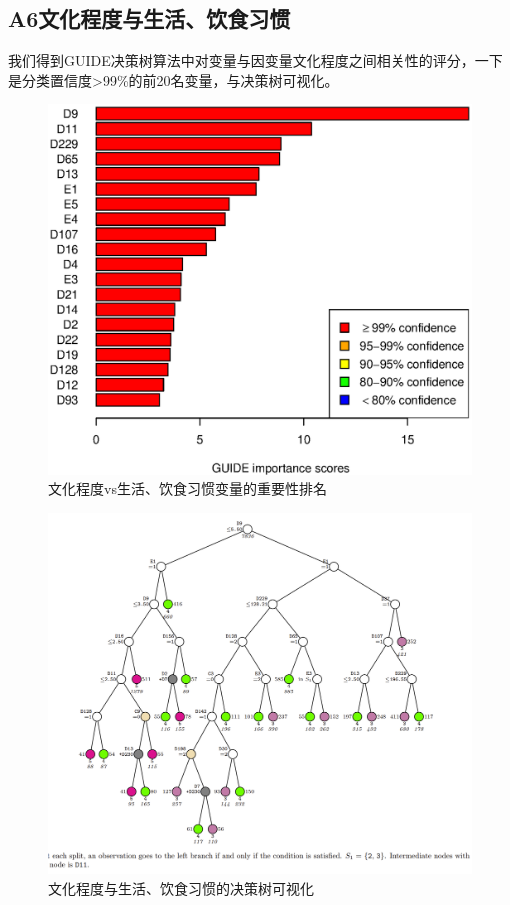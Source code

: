 \documentclass{article}
\begin{document}
\begin{CJK}{UTF8}{gbsn}
\subsection{A6文化程度与生活、饮食习惯}
我们得到GUIDE决策树算法中对变量与因变量文化程度之间相关性的评分，一下是分类置信度>99\%的前20名变量，与决策树可视化。
\begin{figure}[htbp]
    \flushleft
    \includegraphics[scale=0.5]{A6_imp.eps}
    \caption{文化程度vs生活、饮食习惯变量的重要性排名}
    \label{}
\end{figure}
\begin{figure}[htbp]
    \flushleft
    \includegraphics[scale=0.7]{A6_tree.png}
    \caption{文化程度与生活、饮食习惯的决策树可视化}
    \label{}
\end{figure}


\end{CJK}
\end{document}
